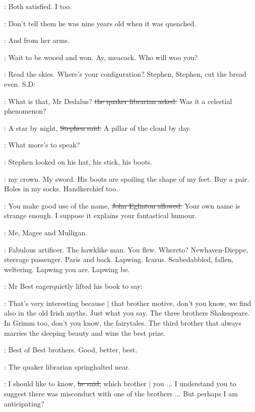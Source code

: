 \StephenInt:
Both satisfied.
I too.

\StephenInt:
Don't tell them he was nine years old when it was quenched.

\StephenInt:
And from her arms.

\StephenInt:
Wait to be wooed and won.
Ay,
meacock.
Who will woo you?

\StephenInt:
Read the skies.
Where's your configuration?
Stephen,
Stephen,
cut the bread even.
S.D:

\librarian:
What is that,
Mr Dedalus?
\sout{the quaker librarian asked.}
Was it a celestial phenomenon?

\Stephen:
A star by night,
\sout{Stephen said.}
A pillar of the cloud by day.

\StephenInt:
What more's to speak?

:
Stephen looked on his hat,
his stick,
his boots.

\StephenInt:
my crown.
My sword.
His boots are spoiling the shape of my feet.
Buy a pair.
Holes in my socks.
Handkerchief too.

\eglinton:
You make good use of the name,
\sout{John Eglinton allowed.}
Your own name is strange enough.
I suppose it explains your fantastical humour.

\StephenInt:
Me, Magee and Mulligan.

\StephenInt:
Fabulous artificer.
The hawklike man.
You flew.
Whereto?
Newhaven-Dieppe,
steerage passenger.
Paris and back.
Lapwing.
Icarus.
Seabedabbled, fallen, weltering.
Lapwing you are.
Lapwing be.

:
Mr Best eagerquietly lifted his book to say:

\best:
That's very interesting because |
that brother motive,
don't you know,
we find also in the old Irish myths.
Just what you say.
The three brothers Shakespeare.
In Grimm too,
don't you know,
the fairytales.
The third brother that always marries the sleeping beauty
and wins the best prize.

\StephenInt:
Best of Best brothers.
Good,
better,
best.

:
The quaker librarian springhalted near.

\librarian:
I should like to know,
\sout{he said,}
which brother |
you ...
I understand you to suggest there was misconduct with one of the brothers ...
But perhaps I am anticipating?

